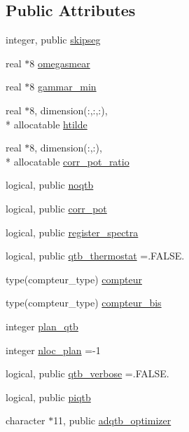 \subsection*{Public Attributes}
\begin{DoxyCompactItemize}
\item 
integer, public \hyperlink{classqtb_adc59c8806c7ede038b1845fc9f8147bb}{skipseg}
\item 
real $\ast$8 \hyperlink{classqtb_a848130400b3dc59232a882616d9beec0}{omegasmear}
\item 
real $\ast$8 \hyperlink{classqtb_af53ecd68e28f6a8f53d49a5882061c03}{gammar\-\_\-min}
\item 
real $\ast$8, dimension(\-:,\-:,\-:), \\*
allocatable \hyperlink{classqtb_ac36637763a01844c4f1f18d5035c9977}{htilde}
\item 
real $\ast$8, dimension(\-:,\-:), \\*
allocatable \hyperlink{classqtb_aa29c1c8fec4a13230ea627fbd6962a10}{corr\-\_\-pot\-\_\-ratio}
\item 
logical, public \hyperlink{classqtb_aa28fc5f309cb469a62634069b2d16444}{noqtb}
\item 
logical, public \hyperlink{classqtb_a617a1a716e7599e62eca164178f38df2}{corr\-\_\-pot}
\item 
logical, public \hyperlink{classqtb_a872fe2905adbcf616ccc4c285220d0d2}{register\-\_\-spectra}
\item 
logical, public \hyperlink{classqtb_a9f30b1695ddee28edb2158790d43b14f}{qtb\-\_\-thermostat} =.F\-A\-L\-S\-E.
\item 
type(compteur\-\_\-type) \hyperlink{classqtb_ab733e1c72aab6e2efbb6f73fe66a9bde}{compteur}
\item 
type(compteur\-\_\-type) \hyperlink{classqtb_a02996b871c2484af286eac8a88a9bcbc}{compteur\-\_\-bis}
\item 
integer \hyperlink{classqtb_ab621da1de10f5405f43fac11e3e7c180}{plan\-\_\-qtb}
\item 
integer \hyperlink{classqtb_ae7544bfdc2b805f539c32e20bfabf0f1}{nloc\-\_\-plan} =-\/1
\item 
logical, public \hyperlink{classqtb_a01848b620e9b24836a371122c84a71f2}{qtb\-\_\-verbose} =.F\-A\-L\-S\-E.
\item 
logical, public \hyperlink{classqtb_a2bb4d73d947c3d5e3fb0c00dca3bfd26}{piqtb}
\item 
character $\ast$11, public \hyperlink{classqtb_a5fa4fc71571ec956dd7c4f935e755c4f}{adqtb\-\_\-optimizer}
\item 

\end{DoxyCompactItemize}
